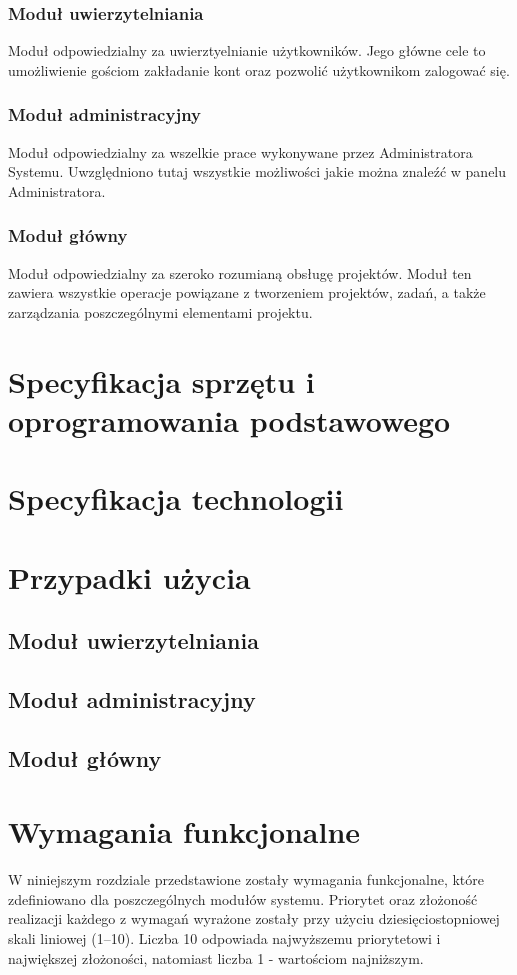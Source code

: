 \documentclass[12pt, oneside, final]{report}
\begin{document}
\subsection{Moduł uwierzytelniania}
Moduł odpowiedzialny za uwierztyelnianie użytkowników. Jego główne cele to umożliwienie gościom zakładanie kont oraz pozwolić użytkownikom zalogować się.
\subsection{Moduł administracyjny}
Moduł odpowiedzialny za wszelkie prace wykonywane przez Administratora Systemu. Uwzględniono tutaj wszystkie możliwości jakie można znaleźć w panelu Administratora.
\subsection{Moduł główny}
Moduł odpowiedzialny za szeroko rozumianą obsługę projektów. Moduł ten zawiera wszystkie operacje powiązane z tworzeniem projektów, zadań, a także zarządzania poszczególnymi elementami projektu.

\chapter{Specyfikacja sprzętu i oprogramowania podstawowego}
\todo
\chapter{Specyfikacja technologii}
\todo
\chapter{Przypadki użycia}
\section{Moduł uwierzytelniania}

\section{Moduł administracyjny}

\section{Moduł główny}


\chapter{Wymagania funkcjonalne}
W niniejszym rozdziale przedstawione zostały wymagania funkcjonalne, które zdefiniowano dla poszczególnych modułów systemu. Priorytet oraz złożoność realizacji każdego z wymagań wyrażone zostały przy użyciu dziesięciostopniowej skali liniowej (1--10). Liczba 10 odpowiada najwyższemu priorytetowi i największej złożoności, natomiast liczba 1 - wartościom najniższym.
\end{document}

